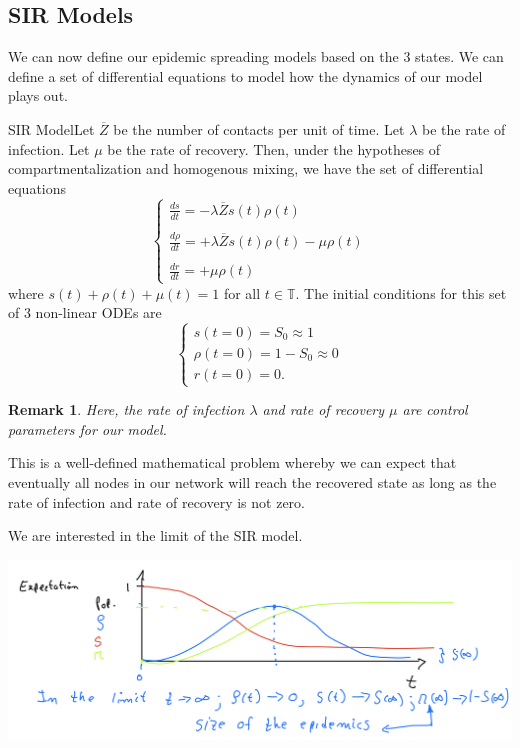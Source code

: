 \documentclass[twoside]{article}
\newtheorem{remark}[theorem]{Remark}
\begin{document}
\subsection{SIR Models}
We can now define our epidemic spreading models based on the 3 states. We can define a set of differential equations to model how the dynamics of our model plays out.
\begin{definition_exam}{SIR Model}{}Let $\overline{Z}$ be the number of contacts per unit of time. Let $\lambda$ be the rate of infection. Let $\mu$ be the rate of recovery. Then, under the hypotheses of compartmentalization and homogenous mixing, we have the set of differential equations
$$
\begin{cases}
\frac{ds}{dt} = -\lambda \overline{Z}s(t)\rho(t)\\\\
\frac{d\rho}{dt} = +\lambda \overline{Z}s(t)\rho(t) - \mu \rho(t)\\\\
\frac{dr}{dt} = +\mu\rho(t)
\end{cases}
$$
where $s(t) + \rho(t) + \mu(t) = 1$ for all $t \in \mathbb{T}.$ The initial conditions for this set of 3 non-linear ODEs are 
$$
\begin{cases}
s(t = 0) = S_0 \approx 1\\
\rho(t = 0) = 1 - S_0 \approx 0\\
r(t = 0) = 0.
\end{cases}
$$
\end{definition_exam}

\begin{remark}Here, the rate of infection $\lambda$ and rate of recovery $\mu$ are control parameters for our model.
\end{remark}

This is a well-defined mathematical problem whereby we can expect that eventually all nodes in our network will reach the recovered state as long as the rate of infection and rate of recovery is not zero.

We are interested in the limit of the SIR model.
\begin{center}
\includegraphics[scale=0.4]{SIR-Limit}
\end{center}
\end{document}
